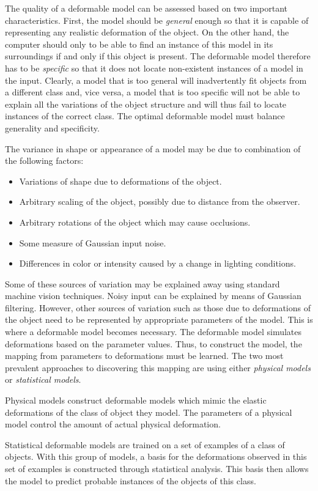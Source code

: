 \documentclass[11pt,a4paper,twoside]{report}
\begin{document}
The quality of a deformable model can be assessed based on two important
characteristics. First, the model should be \textit{general} enough so that it
is capable of representing any realistic deformation of the object.
On the other hand, the computer should only to be able to find an instance of this
model in its surroundings if and only if this object is present. The deformable model
therefore has to be \textit{specific} so that it does not locate non-existent
instances of a model in the input. Clearly, a model that is too general will inadvertently fit objects from a
different class and, vice versa, a model that is too specific will not be able to
explain all the variations of the object structure and will thus fail to locate
instances of the correct class. The optimal deformable model must balance
generality and specificity.

The variance in shape or appearance of a model may be due to combination of the following
factors:
\begin{itemize}
\item Variations of shape due to deformations of the object.
\item Arbitrary scaling of the object, possibly due to distance from the observer.
\item Arbitrary rotations of the object which may cause occlusions. 
\item Some measure of Gaussian input noise.
\item Differences in color or intensity caused by a change in lighting conditions.
\end{itemize}
Some of these sources of variation may be explained away using standard machine
vision techniques. Noisy input can be explained by means of Gaussian
filtering. However, other sources of variation such as those due to deformations of the
object need to be represented by appropriate parameters of the model. This is
where a deformable model becomes necessary. The
deformable model simulates deformations based on the parameter values. Thus, to
construct the model, the mapping from parameters to deformations must be learned. The two
most prevalent approaches to discovering this mapping are using either \textit{physical
models} or \textit{statistical models}.

Physical models construct deformable models which mimic the elastic deformations
of the class of object they model. The parameters of a physical model control the amount
of actual physical deformation.

Statistical deformable models are trained on a set of examples of a class of
objects. With this group of models, a basis for the deformations observed in
this set of examples is constructed through statistical analysis. This basis then allows the model to predict
probable instances of the objects of this class. 
\end{document}

